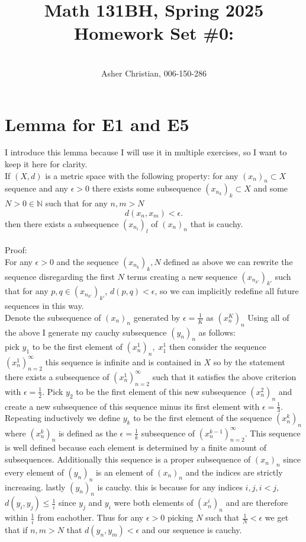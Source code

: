 \documentclass[11pt]{article}
\newcommand{\cnum}{Math 131BH}
\newcommand{\ced}{Spring 2025}
\newcommand{\ctitle}[4]{\title{\vspace{-0.5in}\cnum, \ced\\Homework Set #1: #2}\author{\vspace{-0.35in}\\#3, #4}}
\begin{document}
\ctitle{\#0}{}{Asher Christian}{006-150-286}
\date{}
\maketitle
\section{Lemma for E1 and E5}
I introduce this lemma because I will use it in multiple exercises, so I want to keep it here for clarity.
\\
If $(X,d)$ is a metric space with the following property: for any $(x_n)_n \subset X$ sequence and any $\epsilon > 0$
there exists some subsequence $(x_{n_k})_k \subset X$ and some $N > 0 \in \mathbb{N}$ such that for any $n,m > N$
 \[
d(x_n,x_m) < \epsilon
.\] 
then there exists a subsequence $(x_{n_l})_l$ of $(x_n)_n$  that is cauchy.\\
\\
Proof:\\
For any $\epsilon > 0$ and the sequence $(x_{n_k})_k, N$ defined as above we can rewrite the sequence disregarding the first $N$ terms
creating a new sequence $(x_{n_{k'}})_{k'}$
such that for any $p,q \in (x_{n_{k'}})_{k'}$, $d(p,q) < \epsilon$, so we can implicitly redefine all future sequences in this way.\\
Denote the subsequence of $(x_n)_n$ generated by $\epsilon = \frac{1}{K}$ as $(x^{K}_n)_n$
Using all of the above I generate my cauchy subsequence $(y_n)_n$ as follows:\\
pick $y_1$ to be the first element of $(x^{1}_n)_n, \; x_1^{1}$ then consider the sequence $(x_n^{1})_{n=2}^{\infty}$ this sequence is infinite and is contained
in $X$ so by the statement there exists a subsequence of $(x_n^{1})_{n=2}^{\infty}$ such that it satisfies the above criterion with $\epsilon = \frac{1}{2}$.
Pick $y_2$ to be the first element of this new subsequence $(x^{2}_n)_n$ and create a new subsequence of this sequence minus its first element with $\epsilon = \frac{1}{3}$.
Repeating inductively we define $y_{k}$ to be the first element of the sequence $(x^{k}_n)_n$ where $(x^{k}_n)_n$ is defined as the $\epsilon = \frac{1}{k}$ subsequence of
$(x^{k-1}_n)_{n=2}^{\infty}$. This sequence is well defined because each element is determined by a finite amount of subsequences. Additionally this sequence is a proper
subsequence of $(x_n)_n$ since every element of $(y_n)_n$ is an element of $(x_n)_n$ and the indices are strictly increasing. lastly $(y_n)_n$ is cauchy.
this is because for any indices $i,j, i<j$, $d(y_i,y_j) \le \frac{1}{i}$ since $y_j$ and $y_i$ were both elements of $(x^{i}_n)_n$ and are therefore within $\frac{1}{i}$ from eachother.
Thus for any $\epsilon >0$ picking $N$ such that $\frac{1}{N} < \epsilon$ we get that if $n,m > N$ that $d(y_n,y_m) < \epsilon$ and our sequence is cauchy.
\end{document}
